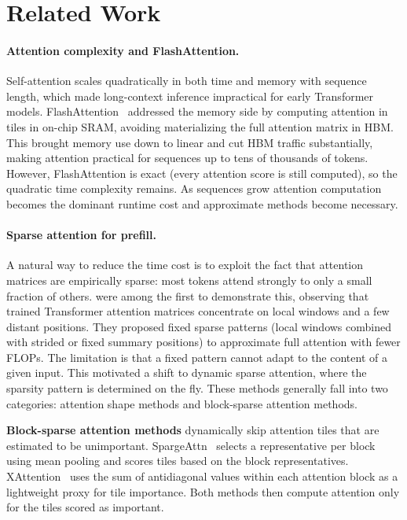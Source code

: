 \section{Related Work}

\paragraph{Attention complexity and FlashAttention.}
Self-attention scales quadratically in both time and memory with sequence length, which made long-context inference impractical for early Transformer models.
FlashAttention~\citep{dao2022flashattention} addressed the memory side by computing attention in tiles in on-chip SRAM, avoiding materializing the full attention matrix in HBM.
This brought memory use down to linear and cut HBM traffic substantially, making attention practical for sequences up to tens of thousands of tokens.
However, FlashAttention is exact (every attention score is still computed), so the quadratic time complexity remains.
As sequences grow attention computation becomes the dominant runtime cost and approximate methods become necessary.

\paragraph{Sparse attention for prefill.}
A natural way to reduce the time cost is to exploit the fact that attention matrices are empirically sparse: most tokens attend strongly to only a small fraction of others.
\citet{child2019generating} were among the first to demonstrate this, observing that trained Transformer attention matrices concentrate on local windows and a few distant positions.
They proposed fixed sparse patterns (local windows combined with strided or fixed summary positions) to approximate full attention with fewer FLOPs.
The limitation is that a fixed pattern cannot adapt to the content of a given input. This motivated a shift to dynamic sparse attention, where the sparsity pattern is determined on the fly. These methods generally fall into two categories: attention shape methods and block-sparse attention methods.

\textbf{Block-sparse attention methods} dynamically skip attention tiles that are estimated to be unimportant. SpargeAttn~\citep{zhang2025spargeattn} selects a representative per block using mean pooling and scores tiles based on the block representatives. XAttention~\citep{xu2025xattention} uses the sum of antidiagonal values within each attention block as a lightweight proxy for tile importance. Both methods then compute attention only for the tiles scored as important.

